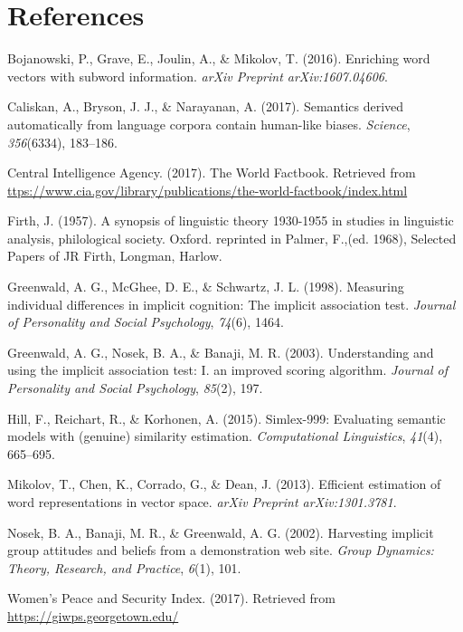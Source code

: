 \documentclass[10pt, letterpaper]{article}
\begin{document}
\section{References}\label{references}

\setlength{\parindent}{-0.1in} \setlength{\leftskip}{0.125in} \noindent

\hypertarget{refs}{}
\hypertarget{ref-bojanowski2016enriching}{}
Bojanowski, P., Grave, E., Joulin, A., \& Mikolov, T. (2016). Enriching
word vectors with subword information. \emph{arXiv Preprint
arXiv:1607.04606}.

\hypertarget{ref-caliskan2017semantics}{}
Caliskan, A., Bryson, J. J., \& Narayanan, A. (2017). Semantics derived
automatically from language corpora contain human-like biases.
\emph{Science}, \emph{356}(6334), 183--186.

\hypertarget{ref-ciafactbook}{}
Central Intelligence Agency. (2017). The World Factbook. Retrieved from
\url{ttps://www.cia.gov/library/publications/the-world-factbook/index.html}

\hypertarget{ref-firth1957synopsis}{}
Firth, J. (1957). A synopsis of linguistic theory 1930-1955 in studies
in linguistic analysis, philological society. Oxford. reprinted in
Palmer, F.,(ed. 1968), Selected Papers of JR Firth, Longman, Harlow.

\hypertarget{ref-greenwald1998measuring}{}
Greenwald, A. G., McGhee, D. E., \& Schwartz, J. L. (1998). Measuring
individual differences in implicit cognition: The implicit association
test. \emph{Journal of Personality and Social Psychology}, \emph{74}(6),
1464.

\hypertarget{ref-greenwald2003understanding}{}
Greenwald, A. G., Nosek, B. A., \& Banaji, M. R. (2003). Understanding
and using the implicit association test: I. an improved scoring
algorithm. \emph{Journal of Personality and Social Psychology},
\emph{85}(2), 197.

\hypertarget{ref-hill2015simlex}{}
Hill, F., Reichart, R., \& Korhonen, A. (2015). Simlex-999: Evaluating
semantic models with (genuine) similarity estimation.
\emph{Computational Linguistics}, \emph{41}(4), 665--695.

\hypertarget{ref-mikolov2013efficient}{}
Mikolov, T., Chen, K., Corrado, G., \& Dean, J. (2013). Efficient
estimation of word representations in vector space. \emph{arXiv Preprint
arXiv:1301.3781}.

\hypertarget{ref-nosek2002harvesting}{}
Nosek, B. A., Banaji, M. R., \& Greenwald, A. G. (2002). Harvesting
implicit group attitudes and beliefs from a demonstration web site.
\emph{Group Dynamics: Theory, Research, and Practice}, \emph{6}(1), 101.

\hypertarget{ref-wps}{}
Women's Peace and Security Index. (2017). Retrieved from
\url{https://giwps.georgetown.edu/}
\end{document}
